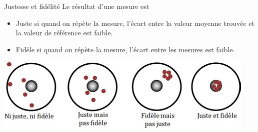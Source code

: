 \documentclass[24pt]{article}
\begin{document}
\begin{concept}{Justesse et fidélité}
    Le résultat d'une mesure est
    \begin{itemize}
        \item Juste si quand on répète la mesure, l'écart entre la valeur moyenne trouvée
              et la valeur de référence est faible.
        \item Fidèle si quand on répète la mesure, l'écart entre les mesures est faible.
    \end{itemize}
    \begin{center}
        \includegraphics[width=0.4\columnwidth]{juste_fidele.jpeg}
    \end{center}

\end{concept}
\end{document}
